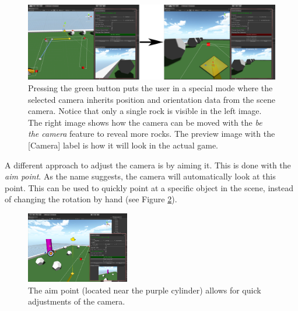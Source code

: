 \begin{figure}[htbp]
\centering
\includegraphics[width=1\textwidth]{Pics/beTheCam}
\caption{Pressing the green button puts the user in a special mode where the selected camera inherits position and orientation data from the scene camera. Notice that only a single rock is visible in the left image. The right image shows how the camera can be moved with the \textit{be the camera} feature to reveal more rocks. The preview image with the [Camera] label is how it will look in the actual game.}
\label{fig:beTheCam}
\end{figure}

A different approach to adjust the camera is by aiming it. This is done with the \textit{aim point}. As the name suggests, the camera will automatically look at this point. This can be used to quickly point at a specific object in the scene, instead of changing the rotation by hand (see Figure \ref{fig:aimPoint}).

\begin{figure}[htbp]
\centering
\includegraphics[width=0.4\textwidth]{Pics/aimPoint}
\caption{The aim point (located near the purple cylinder) allows for quick adjustments of the camera.}
\label{fig:aimPoint}
\end{figure}


